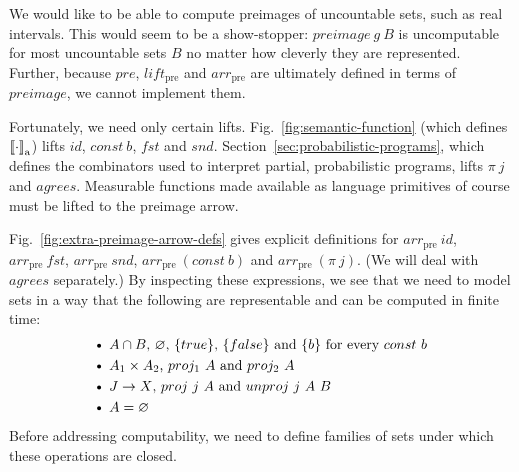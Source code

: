 \documentclass{llncs}
\newcommand{\figref}[1]{Fig.~\ref{#1}}
\newcommand{\arrowlift}{\ensuremath{lift}}
\newcommand{\arrowarr}{\ensuremath{arr}}
\newcommand{\gen}{_\mathrm{a}}
\newcommand{\pre}{_\mathrm{pre}}
\newcommand{\liftpre}{\arrowlift\pre}
\newcommand{\arrpre}{\arrowarr\pre}
\begin{document}
We would like to be able to compute preimages of uncountable sets, such as real intervals.
This would seem to be a show-stopper: $preimage~g~B$ is uncomputable for most uncountable sets $B$ no matter how cleverly they are represented.
Further, because $pre$, $\liftpre$ and $\arrpre$ are ultimately defined in terms of $preimage$, we cannot implement them.

Fortunately, we need only certain lifts.
\figref{fig:semantic-function} (which defines $\meaningof{\cdot}\gen$) lifts $id$, $const~b$, $fst$ and $snd$.
Section~\ref{sec:probabilistic-programs}, which defines the combinators used to interpret partial, probabilistic programs, lifts $\pi~j$ and $agrees$.
Measurable functions made available as language primitives of course must be lifted to the preimage arrow.

\figref{fig:extra-preimage-arrow-defs} gives explicit definitions for $\arrpre~id$, $\arrpre~fst$, $\arrpre~snd$, $\arrpre~(const~b)$ and $\arrpre~(\pi~j)$.
(We will deal with $agrees$ separately.)
By inspecting these expressions, we see that we need to model sets in a way that
the following are representable and can be computed in finite time:
\begin{equation}
\begin{aligned}
	&\text{\textbullet\ $A \i B$, $\emptyset$, $\set{true}$, $\set{false}$ and $\set{b}$ for every $const~b$} \\
	&\text{\textbullet\ $A_1 \times A_2$, $proj_1~A$ and $proj_2~A$} \\
	&\text{\textbullet\ $J \to X$, $proj~j~A$ and $unproj~j~A~B$} \\
	&\text{\textbullet\ $A = \emptyset$} \\
\end{aligned}
\label{eqn:exact-rectangle-ops}
\end{equation}
Before addressing computability, we need to define families of sets under which these operations are closed.
\end{document}

